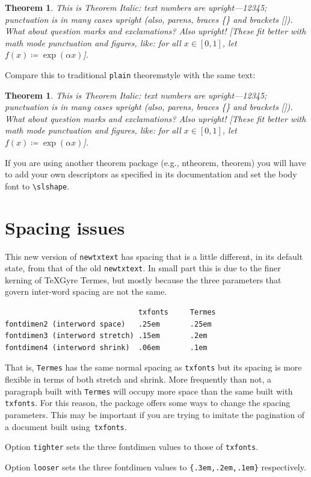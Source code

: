 \documentclass[11pt]{article}
\theoremstyle{oldplain}
\newtheorem{oldthm}{Theorem}[section]
\theoremstyle{plain}
\newtheorem{thm}{Theorem}[section]
\begin{document}
\begin{thm}
This is Theorem Italic: text numbers are upright---12345; punctuation is in many cases upright (also, parens, braces \{\} and brackets []). What about question marks and exclamations? Also upright! [These fit better with math mode punctuation and figures, like: for all $x\in[0,1]$, let $f(x)\coloneq \exp(\alpha x)$].
\end{thm}
Compare this to traditional {\tt plain} theoremstyle with the same text:
\begin{oldthm}
This is Theorem Italic: text numbers are upright---12345; punctuation is in many cases upright (also, parens, braces \{\} and brackets []). What about question marks and exclamations? Also upright! [These fit better with math mode punctuation and figures, like: for all $x\in[0,1]$, let $f(x)\coloneq \exp(\alpha x)$].
\end{oldthm}

If you are using another theorem package (e.g., ntheorem, theorem) you will have to add your own descriptors as specified in its documentation and set the body font to \verb|\slshape|.

\section{Spacing issues}
This new version of {\tt newtxtext} has spacing that is a little different, in its default state, from that of the old {\tt newtxtext}. In small part this is due to the finer kerning of TeXGyre Termes, but mostly because the three parameters that govern inter-word spacing are not the same.
\begin{verbatim}
                               txfonts     Termes
fontdimen2 (interword space)   .25em       .25em
fontdimen3 (interword stretch) .15em       .2em
fontdimen4 (interword shrink)  .06em       .1em
\end{verbatim}
That is, {\tt Termes} has the same normal spacing as {\tt txfonts} but its spacing is more flexible in terms of both stretch and shrink. More frequently than not, a paragraph built with {\tt Termes} will occupy more space than the same built with {\tt txfonts}. For this reason, the package offers some ways to change the spacing parameters. This may be important if you are trying to imitate the pagination of a document built using~{\tt txfonts}.

Option {\tt tighter} sets the three fontdimen values to those of {\tt txfonts}.  

Option {\tt looser} sets the three fontdimen values to \verb|{.3em,.2em,.1em}| respectively. 
\end{document}

